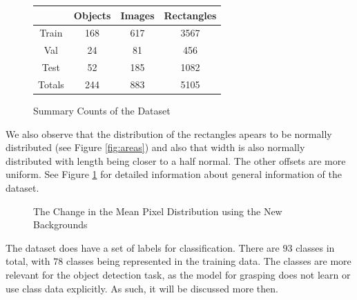 \documentclass{article}
\begin{document}
\begin{figure}
\centering
\begin{tabular}{c|c|c|c|}
&Objects&Images&Rectangles\\
\hline
Train&168&617&3567\\
\hline
Val&24&81&456\\
\hline
Test&52&185&1082\\
\hline
Totals&244&883&5105\\
\hline
\end{tabular}
\caption{Summary Counts of the Dataset}
\label{fig:summary}
\end{figure}

We also observe that the distribution of
the rectangles apears to be normally distributed (see Figure \ref{fig:areas})
and also that width is also normally distributed with length being closer
to a half normal. The other offsets are more uniform.
See Figure \ref{fig:summary} for detailed information about general
information of the dataset.

\begin{figure}
\centering
{}
\qquad
{}
\caption{The Change in the Mean Pixel Distribution using the New Backgrounds}
\label{fig:backgrounds}
\end{figure}


The dataset does have a set of labels for classification.
There are $93$ classes in total, with $78$ classes being represented in the
training data.
The classes are more relevant for the object detection task, as the model for
grasping does not learn or use class data explicitly. As such, it will be discussed
more then.
\end{document}

